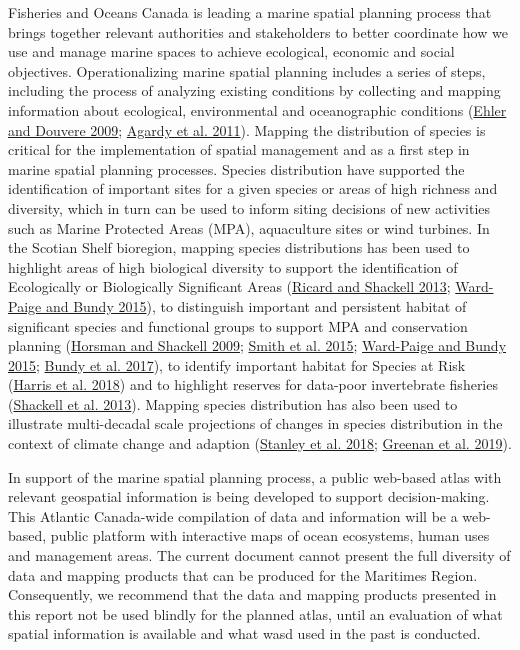 \documentclass[12pt]{article}\usepackage[]{graphicx}\usepackage[]{color}
\begin{document}
Fisheries and Oceans Canada is leading a marine spatial planning process that brings together relevant authorities and stakeholders to better coordinate how we use and manage marine spaces to achieve ecological, economic and social objectives. Operationalizing marine spatial planning includes a series of steps, including the process of analyzing existing conditions by collecting and mapping information about ecological, environmental and oceanographic conditions (\protect\hyperlink{ref-Ehler:2009}{Ehler and Douvere 2009}; \protect\hyperlink{ref-Agardy:2011}{Agardy et al. 2011}). Mapping the distribution of species is critical for the implementation of spatial management and as a first step in marine spatial planning processes. Species distribution have supported the identification of important sites for a given species or areas of high richness and diversity, which in turn can be used to inform siting decisions of new activities such as Marine Protected Areas (MPA), aquaculture sites or wind turbines. In the Scotian Shelf bioregion, mapping species distributions has been used to highlight areas of high biological diversity to support the identification of Ecologically or Biologically Significant Areas (\protect\hyperlink{ref-Ricard:MARatlas:2013}{Ricard and Shackell 2013}; \protect\hyperlink{ref-WardPaige2016}{Ward-Paige and Bundy 2015}), to distinguish important and persistent habitat of significant species and functional groups to support MPA and conservation planning (\protect\hyperlink{ref-Horsman:atlas:2009}{Horsman and Shackell 2009}; \protect\hyperlink{ref-Smith2015}{Smith et al. 2015}; \protect\hyperlink{ref-WardPaige2016}{Ward-Paige and Bundy 2015}; \protect\hyperlink{ref-Bundyetal2017}{Bundy et al. 2017}), to identify important habitat for Species at Risk (\protect\hyperlink{ref-Harris:2018}{Harris et al. 2018}) and to highlight reserves for data-poor invertebrate fisheries (\protect\hyperlink{ref-Shackell2013}{Shackell et al. 2013}). Mapping species distribution has also been used to illustrate multi-decadal scale projections of changes in species distribution in the context of climate change and adaption (\protect\hyperlink{ref-Stanley:2018}{Stanley et al. 2018}; \protect\hyperlink{ref-Greenan:2019}{Greenan et al. 2019}).

In support of the marine spatial planning process, a public web-based atlas with relevant geospatial information is being developed to support decision-making. This Atlantic Canada-wide compilation of data and information will be a web-based, public platform with interactive maps of ocean ecosystems, human uses and management areas. The current document cannot present the full diversity of data and mapping products that can be produced for the Maritimes Region. Consequently, we recommend that the data and mapping products presented in this report not be used blindly for the planned atlas, until an evaluation of what spatial information is available and what wasd used in the past is conducted.
\end{document}
